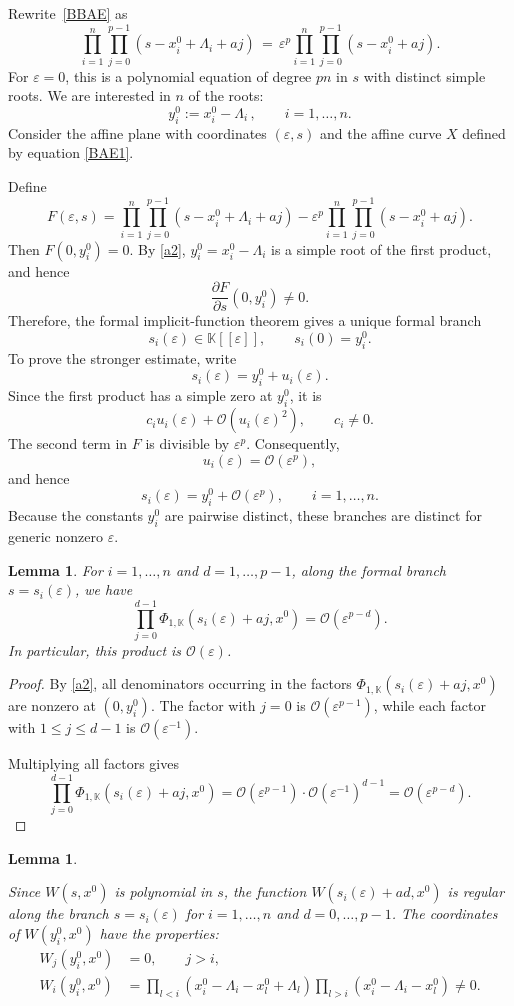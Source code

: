 \documentclass[12pt]{amsart}
\newtheorem{lem}[thm]{Lemma}
\theoremstyle{definition} %
\numberwithin{equation}{section}
\theoremstyle{definition}
\let\mc\mathcal
\let\eps\varepsilon
\let\La\Lambda
\let\le\leqslant
\def\K{{\mathbb K}}
\begin{document}
\smallskip

Rewrite~\eqref{BBAE} as
\begin{equation}
\label{BAE1}
\prod_{i=1}^n\prod_{j=0}^{p-1}(s-x_i^0 + \La_i + aj)
\,=\,\eps^p
\prod_{i=1}^n\prod_{j=0}^{p-1}(s-x_i^0 + aj).
\end{equation}
For $\eps=0$, this is a polynomial equation of degree $pn$ in $s$
with  distinct simple roots. We are interested in $n$ of the roots:
\[
y_i^0:=x_i^0-\La_i\,,\qquad i=1,\dots,n.
\]
Consider the affine plane with coordinates $(\eps, s)$ and the affine curve $X$ defined by
equation \eqref{BAE1}. 

Define
\[
F(\eps,s)
=
\prod_{i=1}^n\prod_{j=0}^{p-1}
(s-x_i^0+\La_i+aj)
-
\eps^p
\prod_{i=1}^n\prod_{j=0}^{p-1}
(s-x_i^0+aj).
\]
Then
$F(0,y_i^0)=0.$
By \eqref{a2}, \(y_i^0=x_i^0-\La_i\) is a simple root of the first product, and hence
\[
\frac{\partial F}{\partial s}(0,y_i^0)\neq0.
\]
Therefore, the formal implicit-function theorem gives a unique formal branch
\[
s_i(\eps)\in\K[[\eps]],
\qquad
s_i(0)=y_i^0.
\]
To prove the stronger estimate, write$$s_i(\eps)=y_i^0+u_i(\eps).$$Since the first product has a simple zero at $y_i^0$, it is$$c_i u_i(\eps)+\mc O(u_i(\eps)^2),
\qquad c_i\neq 0.$$The second term in $F$ is divisible by $\eps^p$. Consequently,$$u_i(\eps)=\mc O(\eps^p),$$and hence$$s_i(\eps)=y_i^0+\mc O(\eps^p), \qquad i=1,\dots,n.$$
Because the constants $y_i^0$ are pairwise distinct, these branches are distinct for generic nonzero $\eps$.


\begin{lem}
\label{lem:B1}
For $i=1,\dots,n$ and $d=1,\dots,p-1$,
along the formal branch $s=s_i(\eps)$, we have
$$\prod_{j=0}^{d-1}
\Phi_{1,\K}(s_i(\eps)+aj,x^0)
=\mc O(\eps^{p-d}).$$
 In particular, this product is $\mc O(\eps)$.
\end{lem}


\begin{proof}

By \eqref{a2}, all denominators occurring in the factors $\Phi_{1,\K}(s_i(\eps)+aj,x^0)$ are nonzero at $(0,y_i^0)$. 
The factor with $j=0$ is $\mc O(\eps^{p-1})$, while each factor with $1\le j\le d-1$ is $\mc O(\eps^{-1})$. 


Multiplying all factors  gives
\[
\prod_{j=0}^{d-1}\Phi_{1,\K}(s_i(\eps)+aj, x^0)
=
\mc O(\eps^{p-1})\cdot\mc O(\eps^{-1})^{d-1}
=
\mc O(\eps^{p-d}).
\]
\end{proof}

\begin{lem}
\label{lem:B2}

Since $W(s,x^0)$ is polynomial in $s$, the function $W(s_i(\eps)+ad,x^0)$ is regular along the branch $s=s_i(\eps)$
for $i=1,\dots, n$ and $d=0,\dots,p-1$.  The coordinates of $W(y_i^0,x^0)$ have the properties:
\begin{align}
W_j(y_i^0, x^0)
&=0,
\qquad
j>i,
\label{B15}
\\
W_i(y_i^0, x^0)
&=
\prod_{l<i}\!\left( x_i^0-\La_i -x_l^0+\La_l         \right)
\prod_{l>i}\!\left( x_i^0-\La_i -x_l^0\right)
\ne0.
\label{B16}
\end{align}
\end{lem}
\end{document}
